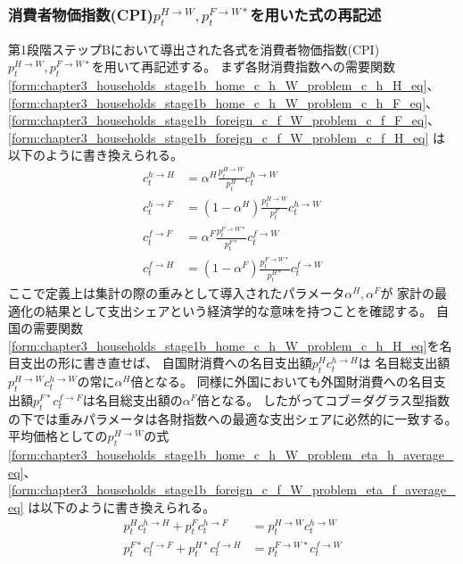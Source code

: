 \subsubsection{消費者物価指数(CPI)\(p_t^{H\to W}, p_t^{F\to W*}\)を用いた式の再記述}
\label{sec:chapter3_households_stage1b_cpi_descriptions}
第1段階ステップBにおいて導出された各式を消費者物価指数(CPI)\(p_t^{H\to W}, p_t^{F\to W*}\)を用いて再記述する。
まず各財消費指数への需要関数
\eqref{form:chapter3_households_stage1b_home_c_h_W_problem_c_h_H_eq}、
\eqref{form:chapter3_households_stage1b_home_c_h_W_problem_c_h_F_eq}、
\eqref{form:chapter3_households_stage1b_foreign_c_f_W_problem_c_f_F_eq}、
\eqref{form:chapter3_households_stage1b_foreign_c_f_W_problem_c_f_H_eq}
は以下のように書き換えられる。
\begin{align}
    \label{form:chapter3_households_stage1b_cpi_descriptions_c_h_H_eq}
        c_t^{h\to H}&=\alpha^H\frac{p_t^{H\to W}}{p_t^H}c_t^{h\to W} \\
    \label{form:chapter3_households_stage1b_cpi_descriptions_c_h_F_eq}
        c_t^{h\to F}&=(1-\alpha^H)\frac{p_t^{H\to W}}{p_t^F}c_t^{h\to W} \\
    \label{form:chapter3_households_stage1b_cpi_descriptions_c_f_F_eq}
        c_t^{f\to F}&=\alpha^F\frac{p_t^{F\to W*}}{p_t^{F*}}c_t^{f\to W} \\
    \label{form:chapter3_households_stage1b_cpi_descriptions_c_f_H_eq}
        c_t^{f\to H}&=(1-\alpha^F)\frac{p_t^{F\to W*}}{p_t^{H*}}c_t^{f\to W}
\end{align}
ここで定義上は集計の際の重みとして導入されたパラメータ\(\alpha^H, \alpha^F\)が
家計の最適化の結果として支出シェアという経済学的な意味を持つことを確認する。
自国の需要関数\eqref{form:chapter3_households_stage1b_home_c_h_W_problem_c_h_H_eq}を名目支出の形に書き直せば、
自国財消費への名目支出額\(p_t^Hc_t^{h\to H}\)は
名目総支出額\(p_t^{H\to W}c_t^{h\to W}\)の常に\(\alpha^H\)倍となる。
同様に外国においても外国財消費への名目支出額\(p_t^{F*}c_t^{f\to F}\)は名目総支出額の\(\alpha^F\)倍となる。
したがってコブ＝ダグラス型指数の下では重みパラメータは各財指数への最適な支出シェアに必然的に一致する。
平均価格としての\(p_t^{H\to W}\)の式
\eqref{form:chapter3_households_stage1b_home_c_h_W_problem_eta_h_average_eq}、
\eqref{form:chapter3_households_stage1b_foreign_c_f_W_problem_eta_f_average_eq}
は以下のように書き換えられる。
\begin{align}
    \label{form:chapter3_households_stage1b_cpi_descriptions_p_H_W_average_eq}
        p_t^Hc_t^{h\to H}+p_t^Fc_t^{h\to F}&=p_t^{H\to W}c_t^{h\to W} \\
    \label{form:chapter3_households_stage1b_cpi_descriptions_p_F_W_star_average_eq}
        p_t^{F*}c_t^{f\to F}+p_t^{H*}c_t^{f\to H}&=p_t^{F\to W*}c_t^{f\to W}
\end{align}
